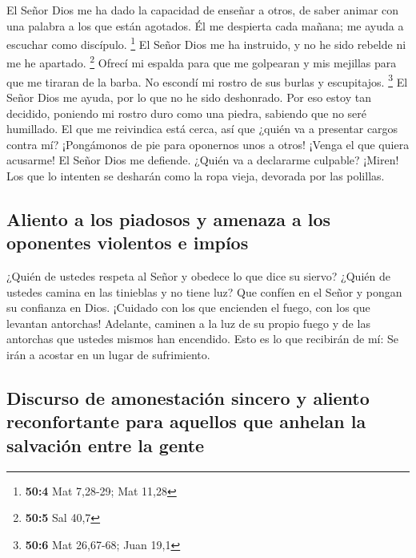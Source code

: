  El Señor Dios me ha dado la capacidad de enseñar a otros,
de saber animar con una palabra a los que están agotados. Él me
despierta cada mañana; me ayuda a escuchar como discípulo. \footnote{\textbf{50:4}
  Mat 7,28-29; Mat 11,28}  El Señor Dios me ha instruido,
y no he sido rebelde ni me he apartado. \footnote{\textbf{50:5} Sal 40,7}
 Ofrecí mi espalda para que me golpearan y mis mejillas
para que me tiraran de la barba. No escondí mi rostro de sus burlas y
escupitajos. \footnote{\textbf{50:6} Mat 26,67-68; Juan 19,1}
 El Señor Dios me ayuda, por lo que no he sido deshonrado.
Por eso estoy tan decidido, poniendo mi rostro duro como una piedra,
sabiendo que no seré humillado.  El que me reivindica está
cerca, así que ¿quién va a presentar cargos contra mí? ¡Pongámonos de
pie para oponernos unos a otros! ¡Venga el que quiera acusarme!
 El Señor Dios me defiende. ¿Quién va a declararme
culpable? ¡Miren! Los que lo intenten se desharán como la ropa vieja,
devorada por las polillas.

\hypertarget{aliento-a-los-piadosos-y-amenaza-a-los-oponentes-violentos-e-impuxedos}{%
\subsection{Aliento a los piadosos y amenaza a los oponentes violentos e
impíos}\label{aliento-a-los-piadosos-y-amenaza-a-los-oponentes-violentos-e-impuxedos}}

 ¿Quién de ustedes respeta al Señor y obedece lo que dice
su siervo? ¿Quién de ustedes camina en las tinieblas y no tiene luz? Que
confíen en el Señor y pongan su confianza en Dios. 
¡Cuidado con los que encienden el fuego, con los que levantan antorchas!
Adelante, caminen a la luz de su propio fuego y de las antorchas que
ustedes mismos han encendido. Esto es lo que recibirán de mí: Se irán a
acostar en un lugar de sufrimiento.

\hypertarget{discurso-de-amonestaciuxf3n-sincero-y-aliento-reconfortante-para-aquellos-que-anhelan-la-salvaciuxf3n-entre-la-gente}{%
\subsection{Discurso de amonestación sincero y aliento reconfortante
para aquellos que anhelan la salvación entre la
gente}\label{discurso-de-amonestaciuxf3n-sincero-y-aliento-reconfortante-para-aquellos-que-anhelan-la-salvaciuxf3n-entre-la-gente}}

